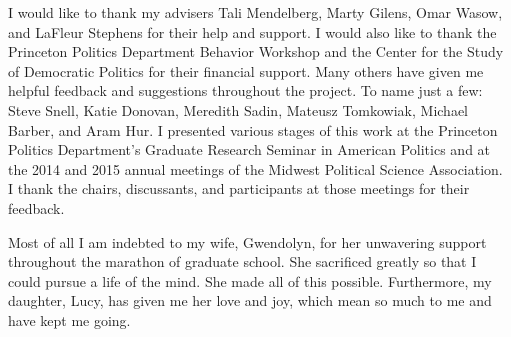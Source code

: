 I would like to thank my advisers Tali Mendelberg, Marty Gilens, Omar Wasow, and LaFleur Stephens for their help and support. I would also like to thank the Princeton Politics Department Behavior Workshop and the Center for the Study of Democratic Politics for their financial support. Many others have given me helpful feedback and suggestions throughout the project. To name just a few: Steve Snell, Katie Donovan, Meredith Sadin, Mateusz Tomkowiak, Michael Barber, and Aram Hur. I presented various stages of this work at the Princeton Politics Department's Graduate Research Seminar in American Politics and at the 2014 and 2015 annual meetings of the Midwest Political Science Association. I thank the chairs, discussants, and participants at those meetings for their feedback.

Most of all I am indebted to my wife, Gwendolyn, for her unwavering support throughout the marathon of graduate school. She sacrificed greatly so that I could pursue a life of the mind. She made all of this possible. Furthermore, my daughter, Lucy, has given me her love and joy, which mean so much to me and have kept me going.